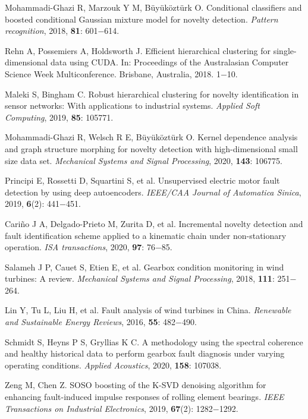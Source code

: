 \documentclass{Style/aas}
\begin{document}
\begin{multicols}{2}
\begin{thebibliography}{99}
     Mohammadi-Ghazi R, Marzouk Y M, Büyüköztürk O. Conditional classifiers and boosted conditional Gaussian mixture model for novelty detection. {\sl Pattern recognition}, 2018, {\bf 81}: 601$-$614.

     Rehn A, Possemiers A, Holdsworth J. Efficient hierarchical clustering for single-dimensional data using CUDA. In: Proceedings of the Australasian Computer Science Week Multiconference. Brisbane, Australia, 2018. 1$-$10.
    
     Maleki S, Bingham C. Robust hierarchical clustering for novelty identification in sensor networks: With applications to industrial systems. {\sl Applied Soft Computing}, 2019, {\bf 85}: 105771.

     Mohammadi-Ghazi R, Welsch R E, Büyüköztürk O. Kernel dependence analysis and graph structure morphing for novelty detection with high-dimensional small size data set.  {\sl Mechanical Systems and Signal Processing}, 2020, {\bf 143}: 106775.

     Principi E, Rossetti D, Squartini S, et al. Unsupervised electric motor fault detection by using deep autoencoders.  {\sl IEEE/CAA Journal of Automatica Sinica}, 2019, {\bf 6}(2): 441$-$451.

     Cariño J A, Delgado-Prieto M, Zurita D, et al. Incremental novelty detection and fault identification scheme applied to a kinematic chain under non-stationary operation. {\sl ISA transactions}, 2020, {\bf 97}: 76$-$85.

     Salameh J P, Cauet S, Etien E, et al. Gearbox condition monitoring in wind turbines: A review. {\sl Mechanical Systems and Signal Processing}, 2018, {\bf 111}: 251$-$264.

     Lin Y, Tu L, Liu H, et al. Fault analysis of wind turbines in China. {\sl Renewable and Sustainable Energy Reviews}, 2016, {\bf 55}: 482$-$490.

     Schmidt S, Heyns P S, Gryllias K C. A methodology using the spectral coherence and healthy historical data to perform gearbox fault diagnosis under varying operating conditions. {\sl Applied Acoustics}, 2020, {\bf 158}: 107038.

     Zeng M, Chen Z. SOSO boosting of the K-SVD denoising algorithm for enhancing fault-induced impulse responses of rolling element bearings. {\sl IEEE Transactions on Industrial Electronics}, 2019, {\bf 67}(2): 1282$-$1292.


\end{thebibliography}
\end{multicols}
\end{document}
